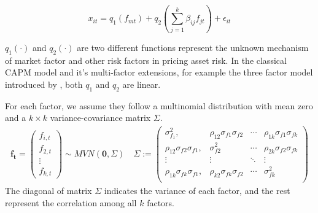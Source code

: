 \documentclass[12pt]{article}
\begin{document}
\[ x_{it} = q_1(f_{mt}) + q_2( \sum_{j=1}^k\beta_{ij}f_{jt}) +\epsilon_{it}  \]

$q_1(\cdot)$ and $q_2(\cdot)$ are two different functions represent the unknown mechanism of market factor and other risk factors in pricing asset risk.
In the classical CAPM model and it's multi-factor extensions, for example the three factor model introduced by , both $q_1$ and $q_2$ are linear.

 For each factor, we assume they follow a multinomial distribution with mean zero and a $k\times k$ variance-covariance matrix $\Sigma$. 
\begin{align*}
\mathbf{f_t} = \begin{pmatrix}
f_{i,t}\\f_{2,t}\\\vdots\\f_{k,t}
\end{pmatrix} \sim MVN(\mathbf{0}, \Sigma) \quad
 \Sigma := 
\begin{pmatrix}
\sigma^2_{f_1}, & \rho_{12}\sigma_{f1}\sigma_{f2} &\cdots  & \rho_{1k}\sigma_{f1}\sigma_{fk}\\
\rho_{12}\sigma_{f2}\sigma_{f1}, & \sigma^2_{f2} &\cdots  & \rho_{2k}\sigma_{f2}\sigma_{fk}\\
\vdots & \vdots & \ddots & \vdots \\
\rho_{1k}\sigma_{fk}\sigma_{f1}, & \rho_{k2}\sigma_{fk}\sigma_{f2} &\cdots  & \sigma^2_{fk}\\
\end{pmatrix}
\end{align*}
The diagonal of matrix $\Sigma$ indicates the variance of each factor, and the rest represent the correlation among all $k$ factors.
\end{document}

